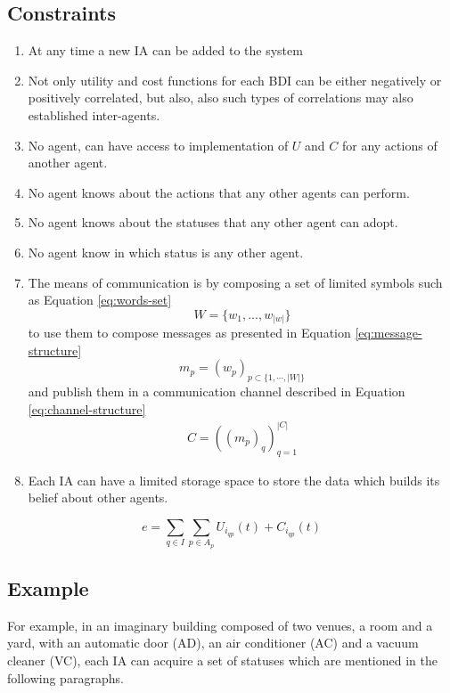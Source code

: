 \documentclass{article}
\begin{document}
\begin{multicols}{2}
		\subsection{Constraints}\label{sec:constraints}
			\begin{enumerate}
				\item At any time a new IA can be added to the system 
				\item Not only utility and cost functions for each BDI can be either negatively or positively correlated, but also, also such types of correlations may also established inter-agents. 
				\item No agent, can have access to implementation of $U$ and $C$ for any actions of another agent. 
				\item No agent knows about the actions that any other agents can perform.
				\item No agent knows about the statuses that any other agent can adopt. 
				\item No agent know in which status is any other agent.
				\item The means of communication is by composing a set of limited symbols such as Equation \ref{eq:words-set}
				\begin{equation}
					W = \{w_1,...,w_{|w|}\}
					\label{eq:words-set}
				\end{equation} 
				to use them to compose messages as presented in Equation \ref{eq:message-structure} 
				\begin{equation}
					m_p=(w_p)_{p \subset \{1,\dotsb,|W|\}}
					\label{eq:message-structure}
				\end{equation}
				and publish them in a communication channel described in Equation \ref{eq:channel-structure}
				\begin{multline}
					C = ((m_p)_q)_{q=1}^{|C|}
					\label{eq:channel-structure}
				\end{multline}
				\item Each IA can have a limited storage space to store the data which builds its belief about other agents.
			\end{enumerate}
			
			
			
			\begin{equation}
				e = \sum\limits_{q \in I}\sum\limits_{p \in A_p} {U_{i_{qp}}(t)+C_{i_{qp}}(t)}
				\label{eq:efficiency}
			\end{equation} 
		
		\subsection{Example}
			For example, in an imaginary building composed of two venues, a room and a yard,  with an automatic door (AD), an air conditioner (AC) and a vacuum cleaner (VC), each IA can acquire a set of statuses which are mentioned in the following paragraphs. 

\end{multicols}
\end{document}
